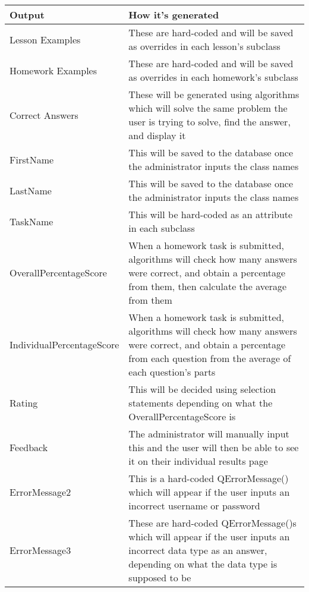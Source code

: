 \begin{center}
\begin{tabular}{|p{4cm}|p{6cm}|} \hline
\textbf{Output} & \textbf{How it's generated} \\ \hline
Lesson Examples & These are hard-coded and will be saved as overrides in each lesson's subclass \\ \hline
Homework Examples & These are hard-coded and will be saved as overrides in each homework's subclass \\ \hline
Correct Answers & These will be generated using algorithms which will solve the same problem the user is trying to solve, find the answer, and display it \\ \hline
FirstName & This will be saved to the database once the administrator inputs the class names \\ \hline
LastName & This will be saved to the database once the administrator inputs the class names \\ \hline
TaskName & This will be hard-coded as an attribute in each subclass \\ \hline
OverallPercentageScore & When a homework task is submitted, algorithms will check how many answers were correct, and obtain a percentage from them, then calculate the average from them \\ \hline
IndividualPercentageScore & When a homework task is submitted, algorithms will check how many answers were correct, and obtain a percentage from each question from the average of each question's parts \\ \hline
Rating & This will be decided using selection statements depending on what the OverallPercentageScore is \\ \hline
Feedback & The administrator will manually input this and the user will then be able to see it on their individual results page \\ \hline
ErrorMessage2 & This is a hard-coded QErrorMessage() which will appear if the user inputs an incorrect username or password \\ \hline
ErrorMessage3 & These are hard-coded QErrorMessage()s which will appear if the user inputs an incorrect data type as an answer, depending on what the data type is supposed to be \\ \hline
\end{tabular}
\end{center}

